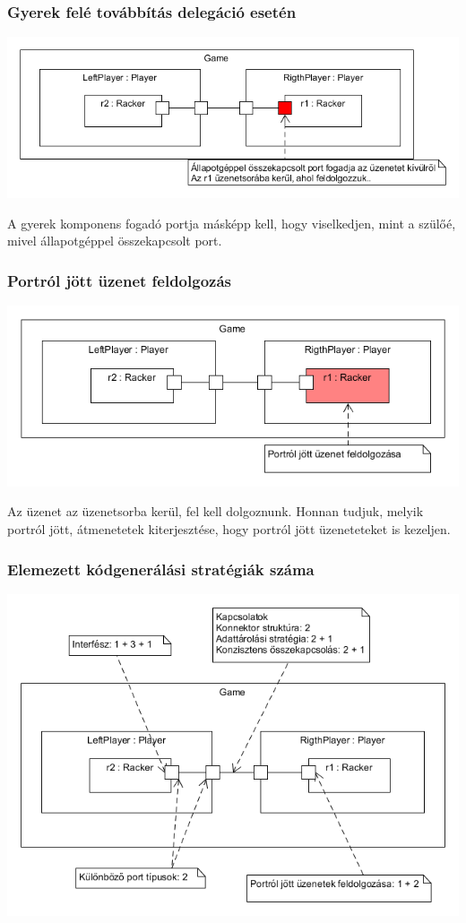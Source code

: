 \documentclass[11pt]{beamer}
\begin{document}
\begin{frame}
	\frametitle{Gyerek felé továbbítás delegáció esetén}
	\begin{center}
	\includegraphics[scale=0.5]{vedes_demo_class_recived.png}
	\end{center}
	A gyerek komponens fogadó portja másképp kell, hogy viselkedjen, mint a szülőé, mivel állapotgéppel összekapcsolt port.
\end{frame}

\begin{frame}
	\frametitle{Portról jött üzenet feldolgozás}
	\begin{center}
	\includegraphics[scale=0.5]{vedes_demo_recived_proc.png}
	\end{center}
		Az üzenet az üzenetsorba kerül, fel kell dolgoznunk. Honnan tudjuk, melyik portról jött, átmenetetek kiterjesztése, hogy portról jött üzeneteteket is kezeljen.
\end{frame}

\begin{frame}
	\frametitle{Elemezett kódgenerálási stratégiák száma}
	
	\begin{center}
	\includegraphics[scale=0.45]{vedes_demo_count.png}
	\end{center}
\end{frame}
\end{document}
